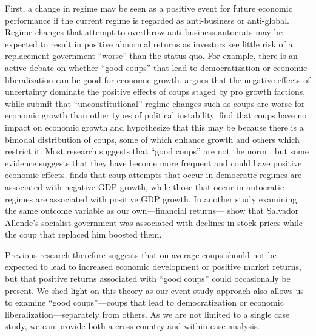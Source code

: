\documentclass[12pt,final,fleqn]{article}
\theoremstyle{plain}
\begin{document}
First, a change in regime may be seen as a positive event for future economic performance if the current regime is regarded as anti-business or anti-global. Regime changes that attempt to overthrow anti-business autocrats may be expected to result in positive abnormal returns as investors see little risk of a replacement government ``worse'' than the status quo. For example, there is an active debate on whether ``good coups'' that lead to democratization or economic liberalization can be good for economic growth. \citet{alesina1996political} argues that the negative effects of uncertainty dominate the positive effects of coups staged by pro growth factions, while \citet{alesina1996income} submit that ``unconstitutional'' regime changes such as coups are worse for economic growth than other types of political instability. \citet{londregan1990poverty} find that coups have no impact on economic growth and hypothesize that this may be because there is a bimodal distribution of coups, some of which enhance growth and others which restrict it. Most research suggests that ``good coups'' are not the norm \citep{derpanopoulos2015coups, powell2011global, thyne2016coup, varol2011democratic}, but some evidence suggests that they have become more frequent \citep{marinov2014coups} and could have positive economic effects. \citet{meyersson2016political} finds that coup attempts that occur in democratic regimes are associated with negative GDP growth, while those that occur in autocratic regimes are associated with positive GDP growth. In another study examining the same outcome variable as our own---financial returns---\citet{girardi2018institution} show that Salvador Allende's socialist government was associated with declines in stock prices while the coup that replaced him boosted them. 

Previous research therefore suggests that on average coups should not be expected to lead to increased economic development or positive market returns, but that positive returns associated with ``good coups'' could occasionally be present. We shed light on this theory as our event study approach also allows us to examine ``good coups''---coups that lead to democratization or economic liberalization---separately from others. As we are not limited to a single case study, we can provide both a cross-country and within-case analysis. 
\end{document}
